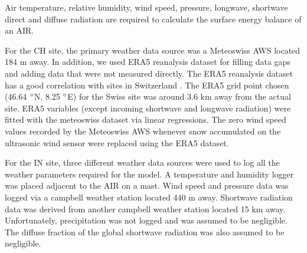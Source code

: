 \documentclass[utf8]{frontiersSCNS} %
\begin{document}
Air temperature, relative humidity, wind speed, pressure, longwave, shortwave direct and diffuse radiation are required
to calculate the surface energy balance of an AIR.

For the CH site, the primary weather data source was a Meteoswiss AWS located 184 m away. In addition, we used ERA5
reanalysis dataset \citep{era5} for filling data gaps and adding data that were not measured directly.  The ERA5
reanalysis dataset has a good correlation with sites in Switzerland \citep{Scherrer_2020}. The ERA5 grid point
chosen (46.64 $\degree$N, 8.25 $\degree$E) for the Swiss site was around 3.6 km away from the actual site.  ERA5
variables (except incoming shortwave and longwave radiation) were fitted with the meteoswiss dataset via linear
regressions. The zero wind speed values recorded by the Meteoswiss AWS whenever snow accumulated on the ultrasonic
wind sensor were replaced using the ERA5 dataset.

For the IN site, three different weather data sources were used to log all the weather parameters required for the
model. A temperature and humidity logger was placed adjacent to the AIR on a mast. Wind speed and pressure data was
logged via a campbell weather station located 440 m away. Shortwave radiation data was derived from another campbell
weather station located 15 km away. Unfortunately, precipitation was not logged and was assumed to be negligible. The
diffuse fraction of the global shortwave radiation was also assumed to be negligible.
\end{document}
